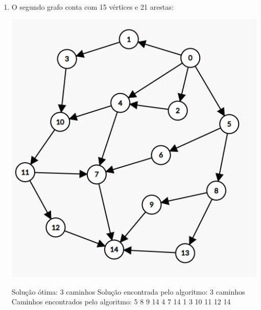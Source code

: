 \begin{enumerate}
    \item O segundo grafo conta com 15 vértices e 21 arestas:
    \begin{center}
        \includegraphics[scale=0.5]{figuras/Grafo2.png}
    \end{center}
    Solução ótima: 3 caminhos\newline
    Solução encontrada pelo algoritmo: 3 caminhos\newline
    Caminhos encontrados pelo algoritmo: 5 8 9 14  4 7 14  1 3 10 11 12 14 \newline
    

\end{enumerate}
